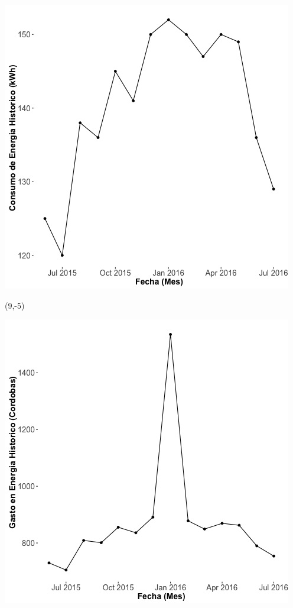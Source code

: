 \documentclass{article}\usepackage[]{graphicx}\usepackage[]{color}
\newenvironment{knitrout}{}{} %
\begin{document}
\begin{knitrout}
\color{fgcolor}
\includegraphics[scale=0.65]{figure/A12_historico_energia} 
\end{knitrout}

 \begin{textblock}{1}(9,-5)
\begin{minipage}{20em}
\begingroup

\endgroup
\end{minipage}
\end{textblock}

\begin{knitrout}
\color{fgcolor}
\includegraphics[scale=0.65]{figure/A12_historico_cordobas} 
\end{knitrout}
\end{document}
